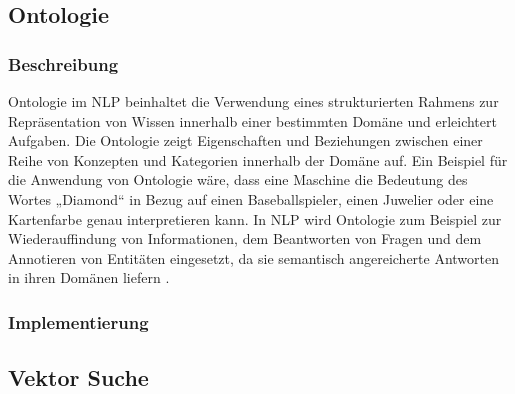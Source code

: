 \subsection{Ontologie}

\subsubsection{Beschreibung}
Ontologie im NLP beinhaltet die Verwendung eines strukturierten Rahmens zur Repräsentation von Wissen innerhalb einer bestimmten Domäne und erleichtert Aufgaben. Die Ontologie zeigt Eigenschaften und Beziehungen zwischen einer Reihe von Konzepten und Kategorien innerhalb der Domäne auf. Ein Beispiel für die Anwendung von Ontologie wäre, dass eine Maschine die Bedeutung des Wortes „Diamond“ in Bezug auf einen Baseballspieler, einen Juwelier oder eine Kartenfarbe genau interpretieren kann. In NLP wird Ontologie zum Beispiel zur Wiederauffindung von Informationen, dem Beantworten von Fragen und dem Annotieren von Entitäten eingesetzt, da sie semantisch angereicherte Antworten in ihren Domänen liefern \cite{Adelkhah2019The} \cite{Naderian2018Ontology}.

\subsubsection{Implementierung}


\subsection{Vektor Suche}

